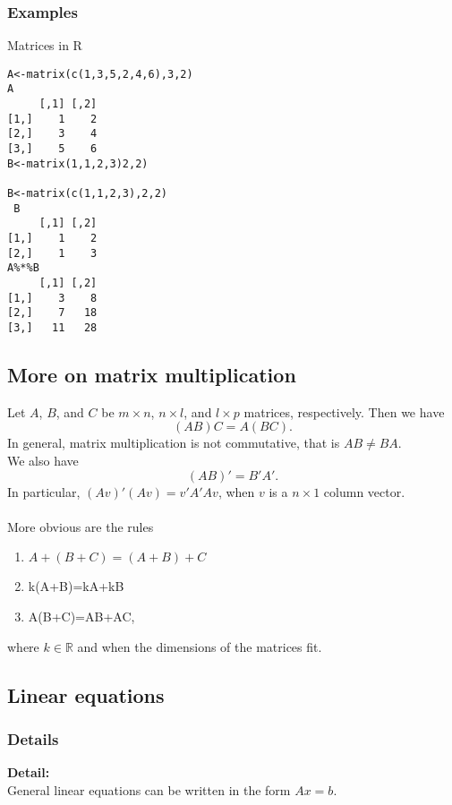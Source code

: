 \documentclass[12pt,a4paper]{article}
\theoremstyle{regla}
\theoremstyle{remark}
\theoremstyle{definition}
\theoremstyle{nonumberbreak}
\begin{document}
\subsubsection{Examples}
\begin{xmpl}
Matrices in R
\begin{lstlisting}
A<-matrix(c(1,3,5,2,4,6),3,2)
A
     [,1] [,2]
[1,]    1    2
[2,]    3    4
[3,]    5    6
B<-matrix(1,1,2,3)2,2)

B<-matrix(c(1,1,2,3),2,2)
 B
     [,1] [,2]
[1,]    1    2
[2,]    1    3
A%*%B
     [,1] [,2]
[1,]    3    8
[2,]    7   18
[3,]   11   28
\end{lstlisting}
\end{xmpl}

\subsection{More on matrix multiplication}
\begin{fbox}
\begin{minipage}{0.97\textwidth}
Let $A$, $B$, and $C$ be $m\times n$, $n\times l$, and $l\times p$ matrices, respectively. Then we have
$$
(AB)C=A(BC).
$$
In general, matrix multiplication is not commutative, that is $AB\neq BA$.\\
We also have
$$
(AB)'=B'A'.
$$
In particular, $(Av)'(Av)=v'A'Av$, when $v$ is a $n\times1$ column vector.\\\\
More obvious are the rules
\begin{enumerate}
\item $A+(B+C)=(A+B)+C$
\item k(A+B)=kA+kB
\item A(B+C)=AB+AC,
\end{enumerate}
where $k\in\mathbb{R}$ and when the dimensions of the matrices fit.
\end{minipage}
\end{fbox}

\subsection{Linear equations}
\subsubsection{Details}
{\bf Detail:}\\
General linear equations can be written in the form $Ax=b$.
\end{document}
